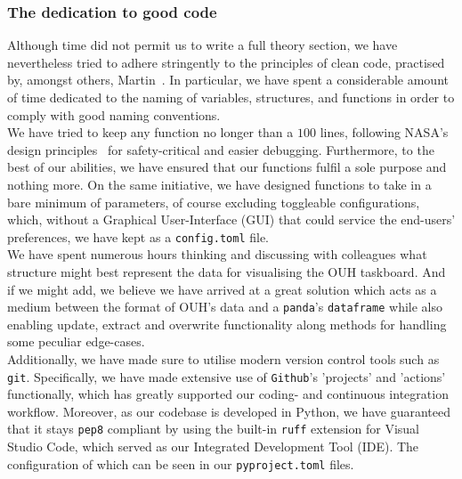 \subsubsection*{The dedication to good code}
Although time did not permit us to write a full theory section, we have nevertheless tried to adhere stringently to the principles of clean code, practised by, amongst others, Martin~\cite{Clean-Code}. In particular, we have spent a considerable amount of time dedicated to the naming of variables, structures, and functions in order to comply with good naming conventions.
\\
We have tried to keep any function no longer than a \(100\) lines, following NASA's design principles~\cite{Wiki-NASA-code} for safety-critical and easier debugging. Furthermore, to the best of our abilities, we have ensured that our functions fulfil a sole purpose and nothing more. On the same initiative, we have designed functions to take in a bare minimum of parameters, of course excluding toggleable configurations, which, without a Graphical User-Interface (GUI) that could service the end-users' preferences, we have kept as a \texttt{config.toml} file.
\\
We have spent numerous hours thinking and discussing with colleagues what structure might best represent the data for visualising the OUH taskboard. And if we might add, we believe we have arrived at a great solution which acts as a medium between the format of OUH's data and a \texttt{panda}'s \texttt{dataframe} while also enabling update, extract and overwrite functionality along methods for handling some peculiar edge-cases.
\\
Additionally, we have made sure to utilise modern version control tools such as \texttt{git}. Specifically, we have made extensive use of \texttt{Github}'s 'projects' and 'actions' functionally, which has greatly supported our coding- and continuous integration workflow. Moreover, as our codebase is developed in Python, we have guaranteed that it stays \texttt{pep8}\cite{pep8} compliant by using the built-in \texttt{ruff} extension for Visual Studio Code, which served as our Integrated Development Tool (IDE). The configuration of which can be seen in our \texttt{pyproject.toml} files.

